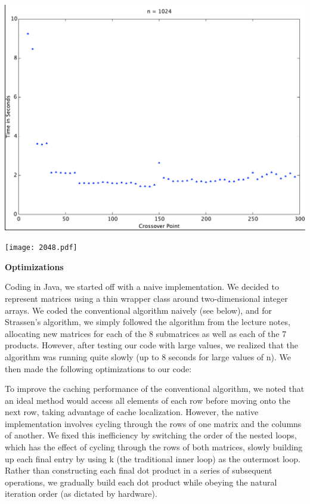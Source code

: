 \documentclass[12pt]{article}
\begin{document}
\includegraphics[scale=0.6]{1024.pdf}

\texttt{[image: 2048.pdf]}

\noindent \textbf{Optimizations}
\bigskip

\noindent Coding in Java, we started off with a naive implementation. We decided to represent matrices using a thin wrapper class around two-dimensional integer arrays. We coded the conventional algorithm naively (see below), and for Strassen's algorithm, we simply followed the algorithm from the lecture notes, allocating new matrices for each of the 8 submatrices as well as each of the 7 products. However, after testing our code with large values, we realized that the algorithm was running quite slowly (up to 8 seconds for large values of n). We then made the following optimizations to our code:
\medskip

\noindent To improve the caching performance of the conventional algorithm, we noted that an ideal method would access all elements of each row before moving onto the next row, taking advantage of cache localization. However, the native implementation involves cycling through the rows of one matrix and the columns of another. We fixed this inefficiency by switching the order of the nested loops, which has the effect of cycling through the rows of both matrices, slowly building up each final entry by using k (the traditional inner loop) as the outermost loop. Rather than constructing each final dot product in a series of subsequent operations, we gradually build each dot product while obeying the natural iteration order (as dictated by hardware).
\bigskip
\end{document}
